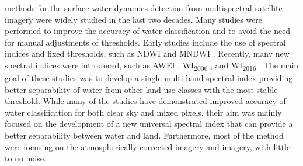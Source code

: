  methods for the surface water dynamics detection from multispectral satellite imagery were widely studied in the last two decades. Many studies were performed to improve the accuracy of water classification and to avoid the need for manual adjustments of thresholds. Early studies include the use of spectral indices and fixed thresholds, such as NDWI \citet{McFeeters1996} and MNDWI \citet{Xu2006}. Recently, many new spectral indices were introduced, such as AWEI \citet{feyisa2014automated}, WI\textsubscript{2006} \citet{homer2004development}, and WI\textsubscript{2016} \citet{fisher2016comparing}. The main goal of these studies was to develop a single multi-band spectral index providing better separability of water from other land-use classes with the most stable threshold.  While many of the studies have demonstrated improved accuracy of water classification for both clear sky and mixed pixels, their aim was mainly focused on the development of a new universal spectral index that can provide a better separability between water and land. Furthermore, most of the method were focusing on the atmospherically corrected imagery and imagery, with little to no noise. 

